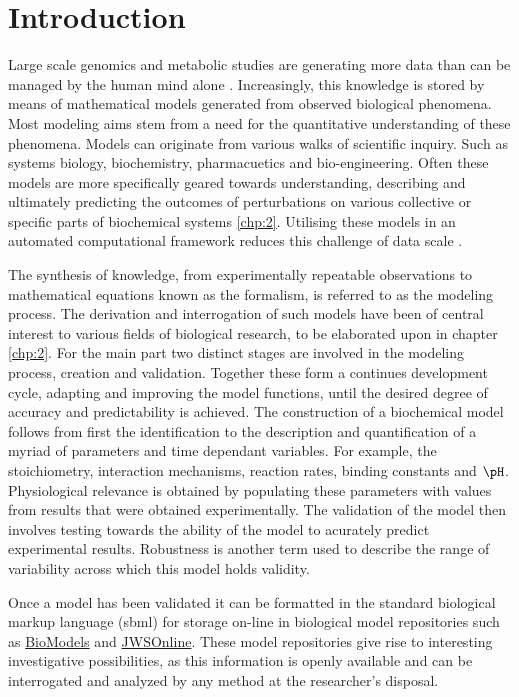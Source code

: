\chapter{Introduction} \label{chp:1}
Large scale genomics and metabolic studies are generating more data than can be managed by the human mind alone \cite{Khalil2015, Boogerd2007, Kell2006}. Increasingly, this knowledge is stored by means of mathematical models generated from observed biological phenomena. Most modeling aims stem from a need for the quantitative understanding of these phenomena. Models can originate from various walks of scientific inquiry. Such as systems biology, biochemistry, pharmacuetics and bio-engineering. Often these models are more specifically geared towards understanding, describing and ultimately predicting the outcomes of perturbations on various collective or specific parts of biochemical systems \ref{chp:2}. Utilising these models in an automated computational framework reduces this challenge of data scale \cite{Ho2008, Lee2006, Knudsen2004, Bleicher2003, Steuer2003}. 

The synthesis of knowledge, from experimentally repeatable observations to mathematical equations known as the formalism, is referred to as the modeling process. The derivation and interrogation of such models have been of central interest to various fields of biological research, to be elaborated upon in chapter \ref{chp:2}. For the main part two distinct stages are involved in the modeling process, creation and validation. Together these form a continues development cycle, adapting and improving the model functions, until the desired degree of accuracy and predictability is achieved. The construction of a biochemical model follows from first the identification to the description and quantification of a myriad of parameters and time dependant variables. For example, the stoichiometry, interaction mechanisms, reaction rates, binding constants and $\pH$. Physiological relevance is obtained by populating these parameters with values from results that were obtained experimentally. The validation of the model then involves testing towards the ability of the model to acurately predict experimental results. Robustness is another term used to describe the range of variability across which this model holds validity.

Once a model has been validated it can be formatted in the standard biological markup language (\gls{sbml}) for storage on-line in biological model repositories such as \href{https://www.ebi.ac.uk/biomodels-main/}{BioModels} and \href{https://jjj.bio.vu.nl}{JWSOnline}. These model repositories give rise to interesting investigative possibilities, as this information is openly available and can be interrogated and analyzed by any method at the researcher's disposal. 

